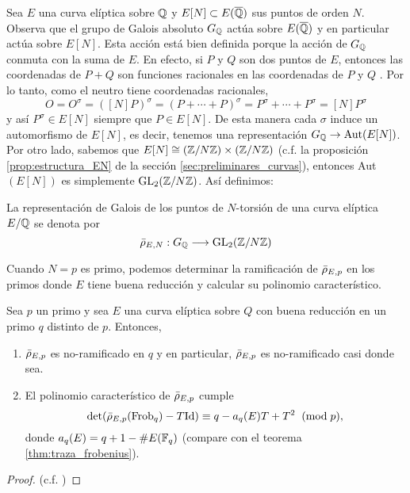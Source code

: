 \documentclass[../../tesis_maestria]{subfiles}
\begin{document}
Sea $E$ una curva el\'iptica sobre $\mathbb{Q}$ y $E[N]\subset E(\overline{\mathbb{Q}})$ sus puntos de orden $N$. Observa que el grupo de Galois absoluto $G_{\mathbb{Q}}$ act\'ua sobre $E(\overline{\mathbb{Q}})$ y en particular act\'ua sobre $E[N]$. Esta acci\'on est\'a bien definida porque la acci\'on de $G_{\mathbb{Q}}$ conmuta con la suma de $E$. En efecto, si $P$ y $Q$ son dos puntos de $E$, entonces las coordenadas de $P+Q$ son funciones racionales en las coordenadas de $P$ y $Q$ \cite[\S III.2, Group Law Algorithm]{SilvermanTAOEC}. Por lo tanto, como el neutro tiene coordenadas racionales,
\[
  O=O^{\sigma}=([N]P)^{\sigma}=(P+\cdots+P)^{\sigma}=
  P^{\sigma}+\cdots+P^{\sigma}=[N]P^{\sigma}
\]
y as\'i $P^{\sigma}\in E[N]$ siempre que $P\in E[N]$. De esta manera cada $\sigma$ induce un automorfismo de $E[N]$, es decir, tenemos una representaci\'on $G_{\mathbb{Q}}\rightarrow\text{Aut}(E[N])$. Por otro lado, sabemos que $E[N]\cong(\mathbb{Z}/N\mathbb{Z})\times(\mathbb{Z}/N\mathbb{Z})$  (c.f. la proposici\'on \ref{prop:estructura_EN} de la secci\'on \ref{sec:preliminares_curvas}), entonces Aut$(E[N])$ es simplemente $\mathrm{GL}_2(\mathbb{Z}/N\mathbb{Z})$. As\'i definimos:

\begin{defin}
  La representaci\'on de Galois de los puntos de $N$-torsi\'on de una curva el\'iptica $E/\mathbb{Q}$  se denota por
  \[
    \bar{\rho}_{E,N}:G_{\mathbb{Q}}\longrightarrow \mathrm{GL}_2(\mathbb{Z}/N\mathbb{Z})
  \]
\end{defin}

Cuando $N=p$ es primo, podemos determinar la ramificaci\'on de $\bar{\rho}_{E,p}$ en los primos donde $E$ tiene buena reducci\'on y calcular su polinomio caracter\'istico.

\begin{prop}\label{prop:prop_de_rhop}
  Sea $p$ un primo y sea $E$ una curva el\'iptica sobre $Q$ con buena reducci\'on en un primo $q$ distinto de $p$. Entonces,
  \begin{enumerate}[label=\roman*)]
  \item $\bar{\rho}_{E,p}$ es no-ramificado en $q$ y en particular, $\bar{\rho}_{E,p}$ es no-ramificado casi donde sea.
  \item El polinomio caracter\'istico de $\bar{\rho}_{E,p}$ cumple
    \[
      \det(\bar{\rho}_{E,p}(\mathrm{Frob}_q)-T\mathrm{Id})\equiv q-a_{q}(E)T+T^2 \;\;(\mathrm{mod}\; p),
    \]
    donde $a_q(E)=q+1-\# E(\mathbb{F}_q)$ (compare con el teorema \ref{thm:traza_frobenius}).
  \end{enumerate}
\end{prop}
\begin{proof}
  (c.f. \cite[\S3.3, proposici\'on 3.15]{SaitoFLTBT})
\end{proof}
\end{document}
